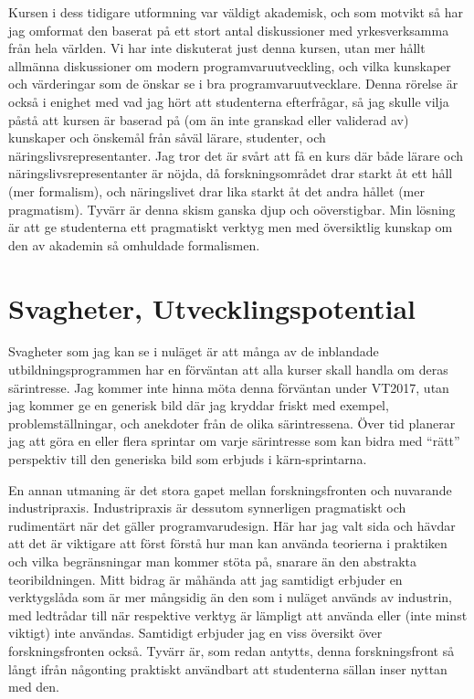 \documentclass[10pt,t,a4paper]{article}
\begin{document}
Kursen i dess tidigare utformning var väldigt akademisk, och som motvikt så har jag omformat den baserat på ett stort antal diskussioner med yrkesverksamma från hela världen. Vi har inte diskuterat just denna kursen, utan mer hållt allmänna diskussioner om modern programvaruutveckling, och vilka kunskaper och värderingar som de önskar se i bra programvaruutvecklare. Denna rörelse är också i enighet med vad jag hört att studenterna efterfrågar, så jag skulle vilja påstå att kursen är baserad på (om än inte granskad eller validerad av) kunskaper och önskemål från såväl lärare, studenter, och näringslivsrepresentanter. Jag tror det är svårt att få en kurs där både lärare och näringslivsrepresentanter är nöjda, då forskningsområdet drar starkt åt ett håll (mer formalism), och näringslivet drar lika starkt åt det andra hållet (mer pragmatism). Tyvärr är denna skism ganska djup och oöverstigbar. Min lösning är att ge studenterna ett pragmatiskt verktyg men med översiktlig kunskap om den av akademin så omhuldade formalismen.
\section{Svagheter, Utvecklingspotential}
\label{sec:orgheadline4}
Svagheter som jag kan se i nuläget är att många av de inblandade utbildningsprogrammen har en förväntan att alla kurser skall handla om deras särintresse. Jag kommer inte hinna möta denna förväntan under VT2017, utan jag kommer ge en generisk bild där jag kryddar friskt med exempel, problemställningar, och anekdoter från de olika särintressena. Över tid planerar jag att göra en eller flera sprintar om varje särintresse som kan bidra med ``rätt'' perspektiv till den generiska bild som erbjuds i kärn-sprintarna.

En annan utmaning är det stora gapet mellan forskningsfronten och nuvarande industripraxis. Industripraxis är dessutom synnerligen pragmatiskt och rudimentärt när det gäller programvarudesign. Här har jag valt sida och hävdar att det är viktigare att först förstå hur man kan använda teorierna i praktiken och vilka begränsningar man kommer stöta på, snarare än den abstrakta teoribildningen. Mitt bidrag är måhända att jag samtidigt erbjuder en verktygslåda som är mer mångsidig än den som i nuläget används av industrin, med ledtrådar till när respektive verktyg är lämpligt att använda eller (inte minst viktigt) inte användas. Samtidigt erbjuder jag en viss översikt över forskningsfronten också. Tyvärr är, som redan antytts, denna forskningsfront så långt ifrån någonting praktiskt användbart att studenterna sällan inser nyttan med den.
\end{document}
